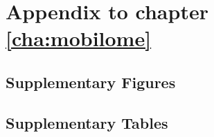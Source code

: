 \chapter{Appendix to chapter \ref{cha:mobilome}}

\section{Supplementary Figures}
% 
% 
% 

\section{Supplementary Tables}


